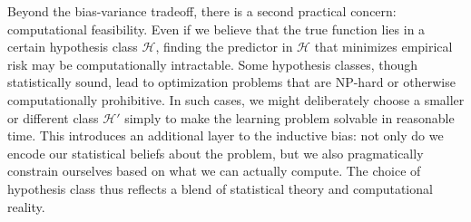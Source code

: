 \medskip
Beyond the bias-variance tradeoff, there is a second practical concern: computational feasibility. Even if we believe that the true function lies in a certain hypothesis class $\mathcal{H}$, finding the predictor in $\mathcal{H}$ that minimizes empirical risk may be computationally intractable. Some hypothesis classes, though statistically sound, lead to optimization problems that are NP-hard or otherwise computationally prohibitive. In such cases, we might deliberately choose a smaller or different class $\mathcal{H}'$ simply to make the learning problem solvable in reasonable time. This introduces an additional layer to the inductive bias: not only do we encode our statistical beliefs about the problem, but we also pragmatically constrain ourselves based on what we can actually compute. The choice of hypothesis class thus reflects a blend of statistical theory and computational reality.

%